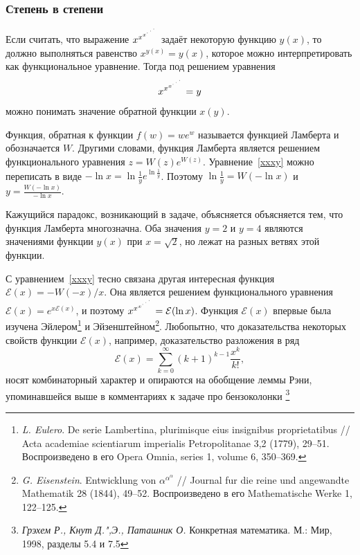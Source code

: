 \documentclass[twoside]{book}
\begin{document}
\subsubsection*{Степень в степени} %
Если считать, что выражение $x^{x^{ x^{{\cdot}^{\mkern2.5mu\cdot^{\mkern2.5mu\cdot}}}}}$ задаёт некоторую функцию $y(x)$, то должно выполняться равенство $x^{y(x)}=y(x)$, которое можно интерпретировать как функциональное уравнение. Тогда под решением  
уравнения 
\begin{equation}
\label{xxxy}
x^{x^{ x^{{\cdot}^{\mkern2.5mu\cdot^{\mkern2.5mu\cdot}}}}}=y
\end{equation}
можно понимать значение обратной функции $x(y).$

Функция,  обратная к функции $f(w)=we^w$  называется функцией Ламберта и обозначается $W$. Другими словами,  функция Ламберта является решением функционального уравнения $z=W(z)e^{W(z)}.$ Уравнение~\eqref{xxxy} можно переписать в виде $-\ln x=\ln\frac{1}{y }e^{\ln\frac{1}{y }}$. Поэтому $\ln\frac{1}{y }=W(-\ln x)$
и
$y=\frac{W(-\ln x)}{ -\ln x}$.

Кажущийся парадокс, возникающий в задаче, объясняется объясняется тем, что  функция Ламберта многозначна.  Оба значения  $y=2$ и $y=4$ являются значениями функции $y(x)$ при $x=\sqrt{2}$, но лежат на разных ветвях этой функции. 

С уравнением~\eqref{xxxy} тесно связана другая интересная функция
$\mathcal{E}(x)=-W(-x)/x$. Она является решением функционального уравнения
$\mathcal{E}(x)=e^{x\mathcal{E}(x)}$, и поэтому $x^{x^{ x^{{\cdot}^{\mkern2.5mu\cdot^{\mkern2.5mu\cdot}}}}}=\mathcal{E}(\ln x)$. Функция $\mathcal{E}(x)$ впервые была изучена Эйлером\footnote{%
\emph{L. Eulero}. De serie Lambertina, plurimisque eius 
insignibus proprietatibus /\!/ Acta academiae scientiarum imperialis 
Petropolitanae 3,2 (1779), 29--51. Воспроизведено в его Opera 
Omnia, series 1, volume 6, 350--369.}
и Эйзенштейном\footnote{%
\emph{G. Eisenstein}. Entwicklung von $\alpha^{\alpha^{\alpha}}$ /\!/ Journal 
fur die reine und angewandte Mathematik 28 (1844), 49--52. 
Воспроизведено в его Mathematische Werke 1, 122--125.}. 
Любопытно, что доказательства некоторых свойств функции $\mathcal{E}(x)$, например, доказательство разложения в ряд
$$\mathcal{E}(x)=\sum_{k=0}^{\infty}(k+1)^{k-1}\frac{x^k}{ k!},$$
носят комбинаторный характер и опираются на обобщение леммы Рэни, упоминавшейся выше в комментариях к задаче про бензоколонки%
\footnote{\emph{Грэхем Р., Кнут Д.",Э., Паташник О.} Конкретная математика. М.: Мир, 1998, разделы 5.4 и 7.5}
\end{document}
